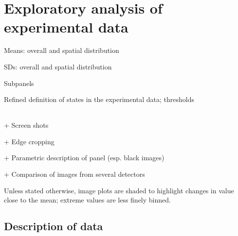 \documentclass[\main/IO-Pixels.tex]{subfiles}
\begin{document}
\section{Exploratory analysis of experimental data}
\begin{outline}
Means: overall and spatial distribution

SDs: overall and spatial distribution

Subpanels

Refined definition of states in the experimental data; thresholds

\\
+ Screen shots

+ Edge cropping

+ Parametric description of panel (esp. black images)

+ Comparison of images from several detectors
\end{outline}
Unless stated otherwise, image plots are shaded to highlight changes in value close to the mean; extreme values are less finely binned.

\subsection{Description of data}
\end{document}
